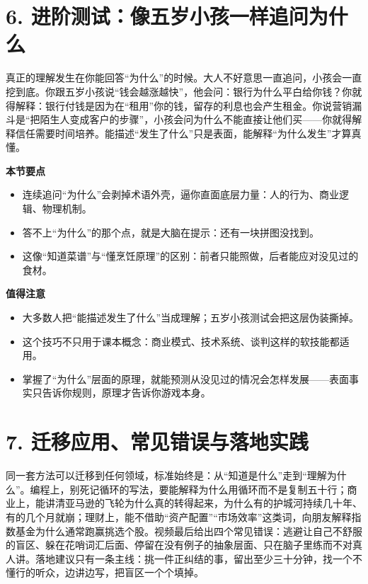 \documentclass[UTF8,a4paper,11pt]{ctexart}
\begin{document}
\section*{6. 进阶测试：像五岁小孩一样追问为什么}

真正的理解发生在你能回答“为什么”的时候。大人不好意思一直追问，小孩会一直挖到底。你跟五岁小孩说“钱会越涨越快”，他会问：银行为什么平白给你钱？你就得解释：银行付钱是因为在“租用”你的钱，留存的利息也会产生租金。你说营销漏斗是“把陌生人变成客户的步骤”，小孩会问为什么不能直接让他们买——你就得解释信任需要时间培养。能描述“发生了什么”只是表面，能解释“为什么发生”才算真懂。

\begin{keyconcept}
\textbf{本节要点}
\begin{itemize}
  \item 连续追问“为什么”会剥掉术语外壳，逼你直面底层力量：人的行为、商业逻辑、物理机制。
  \item 答不上“为什么”的那个点，就是大脑在提示：还有一块拼图没找到。
  \item 这像“知道菜谱”与“懂烹饪原理”的区别：前者只能照做，后者能应对没见过的食材。
\end{itemize}
\end{keyconcept}

\begin{keyconcept}
\textbf{值得注意}
\begin{itemize}
  \item 大多数人把“能描述发生了什么”当成理解；五岁小孩测试会把这层伪装撕掉。
  \item 这个技巧不只用于课本概念：商业模式、技术系统、谈判这样的软技能都适用。
  \item 掌握了“为什么”层面的原理，就能预测从没见过的情况会怎样发展——表面事实只告诉你规则，原理才告诉你游戏本身。
\end{itemize}
\end{keyconcept}


\section*{7. 迁移应用、常见错误与落地实践}

同一套方法可以迁移到任何领域，标准始终是：从“知道是什么”走到“理解为什么”。编程上，别死记循环的写法，要能解释为什么用循环而不是复制五十行；商业上，能讲清亚马逊的飞轮为什么真的转得起来，为什么有的护城河持续几十年、有的几个月就崩；理财上，能不借助“资产配置”“市场效率”这类词，向朋友解释指数基金为什么通常跑赢挑选个股。视频最后给出四个常见错误：逃避让自己不舒服的盲区、躲在花哨词汇后面、停留在没有例子的抽象层面、只在脑子里练而不对真人讲。落地建议只有一条主线：挑一件正纠结的事，留出至少三十分钟，找一个不懂行的听众，边讲边写，把盲区一个个填掉。
\end{document}
